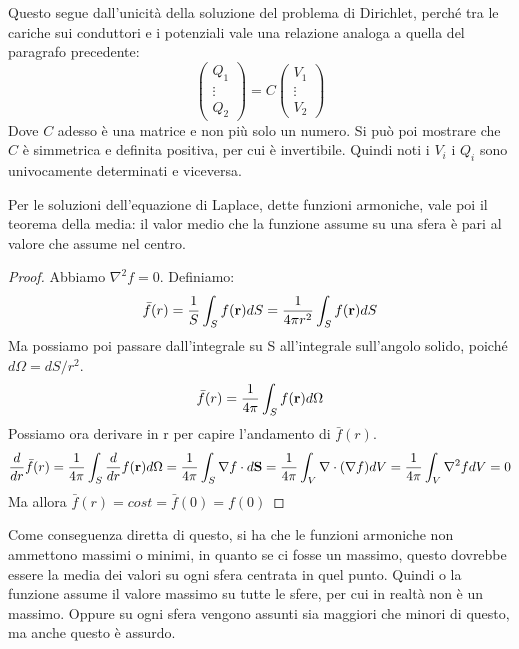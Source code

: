 Questo segue dall'unicità della soluzione del problema di Dirichlet, perché tra le cariche sui conduttori e i potenziali vale una relazione analoga a quella del paragrafo precedente:
\begin{equation}
    \begin{pmatrix}
        Q_1 \\
        \vdots \\
        Q_2
    \end{pmatrix}
    = C 
    \begin{pmatrix}
        V_1 \\
        \vdots \\
        V_2
    \end{pmatrix}
\end{equation}
Dove $C$ adesso è una matrice e non più solo un numero. Si può poi mostrare che $C$ è simmetrica e definita positiva, per cui è invertibile. Quindi noti i $V_i$ i $Q_i$ sono univocamente determinati e viceversa. 

Per le soluzioni dell'equazione di Laplace, dette funzioni armoniche, vale poi il teorema della media: il valor medio che la funzione assume su una sfera è pari al valore che assume nel centro.
\begin{proof}
    Abbiamo $\nabla^2 f = 0$. Definiamo:
    \begin{equation}
        \bar f (r) = \frac{ 1 }{ S } \int_S f(\mathbf r) dS = \frac{ 1 }{ 4 \pi r^2 } \int_S f(\mathbf r) dS
    \end{equation}
    Ma possiamo poi passare dall'integrale su S all'integrale sull'angolo solido, poiché $d\Omega = dS/r^2$. 
    \begin{equation}
        \bar f (r) = \frac{ 1 }{ 4 \pi } \int_S f(\mathbf r) d\Omega
    \end{equation}
    Possiamo ora derivare in r per capire l'andamento di $\bar f(r)$.
    \begin{equation}
        \frac{ d }{ dr } \bar f (r) 
            = \frac{ 1 }{ 4 \pi } \int_S \frac{ d }{ dr } f(\mathbf r) d\Omega 
            = \frac{ 1 }{ 4 \pi } \int_S \nabla f \cdot d \mathbf S
            = \frac{ 1 }{ 4 \pi } \int_V \nabla \cdot (\nabla f) dV
            = \frac{ 1 }{ 4 \pi } \int_V \nabla^2 f dV = 0
    \end{equation}
    Ma allora $\bar f(r) = cost = \bar f(0) = f(0)$
\end{proof}
Come conseguenza diretta di questo, si ha che le funzioni armoniche non ammettono massimi o minimi, in quanto se ci fosse un massimo, questo dovrebbe essere la media dei valori su ogni sfera centrata in quel punto. Quindi o la funzione assume il valore massimo su tutte le sfere, per cui in realtà non è un massimo. Oppure su ogni sfera vengono assunti sia maggiori che minori di questo, ma anche questo è assurdo. 

